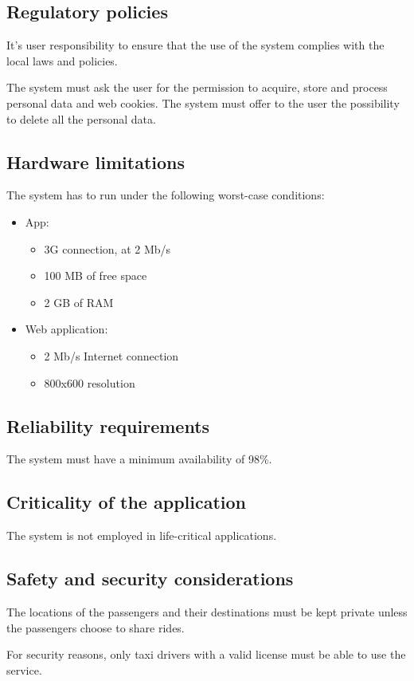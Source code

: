 \subsection{Regulatory policies}
It's user responsibility to ensure that the use of the system complies with the local laws and policies.

The system must ask the user for the permission to acquire, store and process personal data and web cookies. The system must offer to the user the possibility to delete all the personal data.

\subsection{Hardware limitations}
The system has to run under the following worst-case conditions:
\begin{itemize}
\item App:
\begin{itemize}
\item 3G connection, at 2 Mb/s
\item 100 MB of free space
\item 2 GB of RAM
\end{itemize}
\item Web application:
\begin{itemize}
\item 2 Mb/s Internet connection
\item 800x600 resolution
\end{itemize}
\end{itemize}

\subsection{Reliability requirements}
The system must have a minimum availability of 98\%.

\subsection{Criticality of the application}
The system is not employed in life-critical applications.

\subsection{Safety and security considerations}
The locations of the passengers and their destinations must be kept private unless the passengers choose to share rides.

For security reasons, only taxi drivers with a valid license must be able to use the service.
